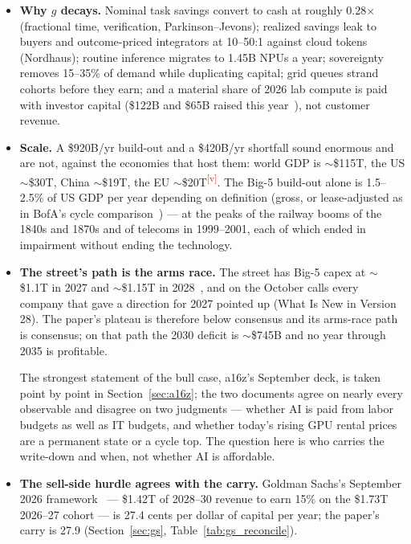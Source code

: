 \documentclass[11pt,letterpaper]{article}
\newcommand{\verify}{\textsuperscript{\textcolor{red}{[v]}}}
\begin{document}
\begin{itemize}
    Water, ratepayer bills, noise and diesel are the stated grounds; Dublin and Amsterdam were the European template. The model now defers 10--35\% of each cohort a year for consent and siting, adds 2--9\% to shell cost for community benefits, water mitigation and relocation, and 0--6\% to cooling opex where evaporative cooling is refused. The net effect is to shift the carry later, not to remove it.
    \item \textbf{Why $g$ decays.} Nominal task savings convert to cash at roughly 0.28$\times$ (fractional time, verification, Parkinson--Jevons); realized savings leak to buyers and outcome-priced integrators at 10--50:1 against cloud tokens (Nordhaus); routine inference migrates to 1.45B NPUs a year; sovereignty removes 15--35\% of demand while duplicating capital; grid queues strand cohorts before they earn; and a material share of 2026 lab compute is paid with investor capital (\$122B and \$65B raised this year~\cite{ref:valueadd_openai,ref:techcrunch_anthropic}), not customer revenue.
    \item \textbf{Scale.} A \$920B/yr build-out and a \$420B/yr shortfall sound enormous and are not, against the economies that host them: world GDP is $\sim$\$115T, the US $\sim$\$30T, China $\sim$\$19T, the EU $\sim$\$20T\verify. The Big-5 build-out alone is 1.5--2.5\% of US GDP per year depending on definition (gross, or lease-adjusted as in BofA's cycle comparison~\cite{ref:a16z_som}) --- at the peaks of the railway booms of the 1840s and 1870s and of telecoms in 1999--2001, each of which ended in impairment without ending the technology.
    \item \textbf{The street's path is the arms race.} The street has Big-5 capex at $\sim$\$1.1T in 2027 and $\sim$\$1.15T in 2028~\cite{ref:gs_capex_bbg,ref:a16z_som}, and on the October calls every company that gave a direction for 2027 pointed up (What Is New in Version 28). The paper's plateau is therefore below consensus and its arms-race path is consensus; on that path the 2030 deficit is $\sim$\$745B and no year through 2035 is profitable.

    The strongest statement of the bull case, a16z's September deck, is taken point by point in Section~\ref{sec:a16z}; the two documents agree on nearly every observable and disagree on two judgments --- whether AI is paid from labor budgets as well as IT budgets, and whether today's rising GPU rental prices are a permanent state or a cycle top. The question here is who carries the write-down and when, not whether AI is affordable.
    \item \textbf{The sell-side hurdle agrees with the carry.} Goldman Sachs's September 2026 framework~\cite{ref:gs_roic2026} --- \$1.42T of 2028--30 revenue to earn 15\% on the \$1.73T 2026--27 cohort --- is 27.4 cents per dollar of capital per year; the paper's carry is 27.9 (Section~\ref{sec:gs}, Table~\ref{tab:gs_reconcile}).


\end{itemize}
\end{document}
